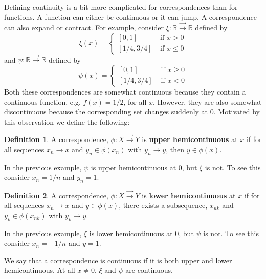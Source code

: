 \documentclass[12pt,reqno]{amsart}
\theoremstyle{definition}
\newtheorem{definition}{Definition}[section]
\def\R{\mathbb{R}}
\renewcommand{\to}{{\rightarrow}}
\newcommand{\corres}{\overrightarrow{\rightarrow}}
\begin{document}
Defining continuity is a bit more complicated for correspondences than
for functions. A function can either be continuous or it can jump. A
correspondence can also expand or contract. For example, consider
$\xi:\R \corres \R$ defined by 
\[ \xi(x) = \begin{cases} 
  [0,1] & \text{ if } x > 0 \\
  [1/4,3/4] & \text{ if } x \leq 0 
\end{cases} \]
and $\psi: \R \corres \R$ defined by
\[ \psi(x) = \begin{cases} 
  [0,1] & \text{ if } x \geq 0 \\
  [1/4,3/4] & \text{ if } x < 0 
\end{cases} \]
Both these correspondences are somewhat continuous because they
contain a continuous function, e.g. $f(x) = 1/2$,  for all
$x$. However, they are also somewhat discontinuous because the
corresponding set changes suddenly at $0$. Motivated by this
observation we define the following:
\begin{definition}
  A correspondence, $\phi: X \corres Y$ is \textbf{upper hemicontinuous} at $x$
  if for all sequences $x_n \to x$ and $y_n \in \phi(x_n)$ with $y_n
  \to y$, then $y \in \phi(x)$. 
\end{definition}
In the previous example, $\psi$ is upper hemicontinuous at  $0$, but $\xi$ is
not. To see this consider $x_n = 1/n$ and $y_n = 1$. 
\begin{definition}
  A correspondence, $\phi: X \corres Y$ is \textbf{lower hemicontinuous} at $x$
  if for all sequences $x_n \to x$ and $y \in \phi(x)$, there exists a
  subsequence, $x_{nk}$ and $y_k \in \phi(x_{nk})$ with $y_k \to y$.  
\end{definition}
In the previous example, $\xi$ is lower hemicontinuous at $0$, but
$\psi$ is not. To see this consider $x_n = -1/n$ and $y = 1$. 

We say that a correspondence is continuous if it is both upper and
lower hemicontinuous. At all $x \neq 0$, $\xi$ and $\psi$ are
continuous. 
\end{document}
